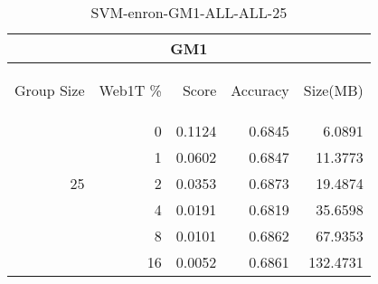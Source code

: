 \begin{center}
\begin{table}[htbp] 
 \begin{center}
\begin{tabular}{ | r | r | r | r | r |}
\hline
\multicolumn{5}{|c|}{GM1}\\
\hline
\begin{sideways}Group Size\end{sideways} & \begin{sideways}Web1T \%\end{sideways} & \begin{sideways}Score\end{sideways} & \begin{sideways}Accuracy\end{sideways} & \begin{sideways}Size(MB)\end{sideways}\\
\hline
\multirow{5}{*}{25}
 & 0 & 0.1124 & 0.6845 & 6.0891\\ \cline{2-5}
 & 1 & 0.0602 & 0.6847 & 11.3773\\ \cline{2-5}
 & 2 & 0.0353 & 0.6873 & 19.4874\\ \cline{2-5}
 & 4 & 0.0191 & 0.6819 & 35.6598\\ \cline{2-5}
 & 8 & 0.0101 & 0.6862 & 67.9353\\ \cline{2-5}
 & 16 & 0.0052 & 0.6861 & 132.4731\\ \cline{2-5}
\hline
\end{tabular}
\caption{SVM-enron-GM1-ALL-ALL-25}
\label{table:SVM-enron-GM1-ALL-ALL-25}
\end{center}
 \end{table}
\end{center}

